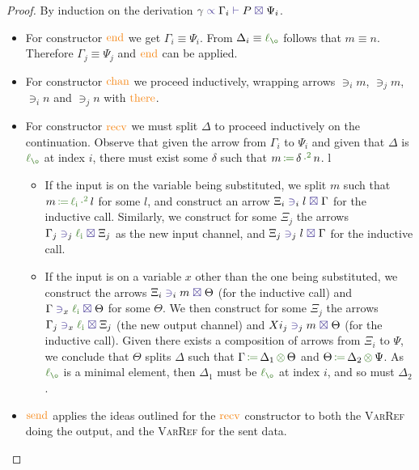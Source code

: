 \documentclass[a4paper,UKenglish,cleveref,autoref,thm-restate,authorcolumns]{lipics-v2019}
\theoremstyle{definition}
\newcommand{\type}[1]{\textcolor{BlueViolet}{\operatorname{#1}}}
\newcommand{\constr}[1]{\textcolor{BurntOrange}{\operatorname{#1}}}
\newcommand{\func}[1]{\textcolor{OliveGreen}{\operatorname{#1}}}
\newcommand{\opsquared}[3]{#1 \, \func{\coloneqq} \, #2 \, \func{\cdot^2} \, #3}
\newcommand{\opctx}[3]{#1 \, \func{\coloneqq} \, #2 \, \func{\otimes} \, #3}
\newcommand{\li}{\func{\ell_i}}
\newcommand{\lz}{\func{\ell_{\o}}}
\newcommand{\types}[4]{#1 \; \type{\propto} \; #2 \; \type{\vdash} \; #3 \; \type{\boxtimes} \; #4}
\newcommand{\containsusage}[4]{#1 \; \type{\ni}_{#2} \; #3 \; \type{\boxtimes} \; #4}
\begin{document}
\begin{proof}
  By induction on the derivation $\types{\gamma}{\Gamma_i}{P}{\Psi_i}$.
  \begin{itemize}
    \item
      For constructor $\constr{end}$ we get $\Gamma_i \equiv \Psi_i$.
      From $\Delta_i \equiv \lz$ follows that $m \equiv n$.
      Therefore $\Gamma_j \equiv \Psi_j$ and $\constr{end}$ can be applied.

    \item
      For constructor $\constr{chan}$ we proceed inductively, wrapping arrows $\ni_i m$, $\ni_j m$, $\ni_i n$ and $\ni_j n$ with $\constr{there}$.
      
    \item
      For constructor $\constr{recv}$ we must split $\Delta$ to proceed inductively on the continuation.
      Observe that given the arrow from $\Gamma_i$ to $\Psi_i$ and given that $\Delta$ is $\lz$ at index $i$, there must exist some $\delta$ such that $\opsquared{m}{\delta}{n}$.
 l     \begin{itemize}
        \item
          If the input is on the variable being substituted, we split $m$ such that $\opsquared{m}{\li}{l}$ for some $l$, and construct an arrow $\containsusage{\Xi_i}{i}{l}{\Gamma}$ for the inductive call.
          Similarly, we construct for some $\Xi_j$ the arrows $\containsusage{\Gamma_j}{j}{\li}{\Xi_j}$ as the new input channel, and $\containsusage{\Xi_j}{j}{l}{\Gamma}$ for the inductive call.
        \item
          If the input is on a variable $x$ other than the one being substituted, we construct the arrows $\containsusage{\Xi_i}{i}{m}{\Theta}$ (for the inductive call) and $\containsusage{\Gamma}{x}{\li}{\Theta}$ for some $\Theta$.
          We then construct for some $\Xi_j$ the arrows $\containsusage{\Gamma_j}{x}{\li}{\Xi_j}$ (the new output channel) and $\containsusage{Xi_j}{j}{m}{\Theta}$ (for the inductive call).
          Given there exists a composition of arrows from $\Xi_i$ to $\Psi$, we conclude that $\Theta$ splits $\Delta$ such that $\opctx{\Gamma}{\Delta_1}{\Theta}$ and $\opctx{\Theta}{\Delta_2}{\Psi}$.
          As $\lz$ is a minimal element, then $\Delta_1$ must be $\lz$ at index $i$, and so must $\Delta_2$.
      \end{itemize}

    \item
      $\constr{send}$ applies the ideas outlined for the $\constr{recv}$ constructor to both the \textsc{VarRef} doing the output, and the \textsc{VarRef} for the sent data.


\end{itemize}
\end{proof}
\end{document}
